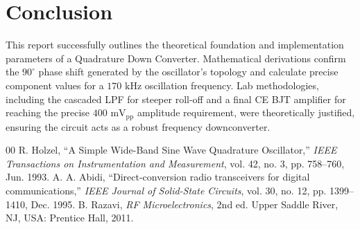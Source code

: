 \documentclass[conference]{IEEEtran}
\begin{document}
\section{Conclusion}
This report successfully outlines the theoretical foundation and implementation parameters of a Quadrature Down Converter. Mathematical derivations confirm the $90^\circ$ phase shift generated by the oscillator's topology and calculate precise component values for a $170\text{ kHz}$ oscillation frequency. Lab methodologies, including the cascaded LPF for steeper roll-off and a final CE BJT amplifier for reaching the precise $400\text{ mV}_{\text{pp}}$ amplitude requirement, were theoretically justified, ensuring the circuit acts as a robust frequency downconverter.

\begin{thebibliography}{00}
 R. Holzel, ``A Simple Wide-Band Sine Wave Quadrature Oscillator,'' \textit{IEEE Transactions on Instrumentation and Measurement}, vol. 42, no. 3, pp. 758--760, Jun. 1993.
 A. A. Abidi, ``Direct-conversion radio transceivers for digital communications,'' \textit{IEEE Journal of Solid-State Circuits}, vol. 30, no. 12, pp. 1399--1410, Dec. 1995.
 B. Razavi, \textit{RF Microelectronics}, 2nd ed. Upper Saddle River, NJ, USA: Prentice Hall, 2011.
\end{thebibliography}
\end{document}
